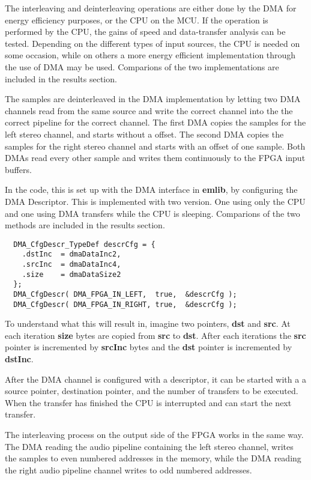The interleaving and deinterleaving operations are either done by the DMA for
energy efficiency purposes, or the CPU on the MCU. If the operation is performed
by the CPU, the gains of speed and data-transfer analysis can be tested. Depending
on the different types of input sources, the CPU is needed on some occasion, while
on others a more energy efficient implementation through the use of DMA may be used.
Comparions of the two implementations are included in the results section.

The samples are deinterleaved in the DMA implementation by letting two DMA channels read from the
same source and write the correct channel into the the correct pipeline for the correct channel.
The first DMA copies the samples for the left stereo channel, and starts without a offset. The
second DMA copies the samples for the right stereo channel and starts with an
offset of one sample. Both DMAs read every other sample and writes them
continuously to the FPGA input buffers.

In the code, this is set up with the DMA interface in {\bf emlib}, by configuring the DMA Descriptor.
This is implemented with two version. One using only the CPU and one using DMA transfers
while the CPU is sleeping. Comparions of the two methods are included in the results section.

\begin{lstlisting}
  DMA_CfgDescr_TypeDef descrCfg = {
    .dstInc  = dmaDataInc2,
    .srcInc  = dmaDataInc4,
    .size    = dmaDataSize2
  };
  DMA_CfgDescr( DMA_FPGA_IN_LEFT,  true,  &descrCfg );
  DMA_CfgDescr( DMA_FPGA_IN_RIGHT, true,  &descrCfg );
\end{lstlisting}
To understand what this will result in, imagine two pointers, {\bf dst} and {\bf src}.
At each iteration {\bf size} bytes are copied from {\bf src} to {\bf dst}. After each
iterations the {\bf src} pointer is incremented by {\bf srcInc} bytes and the {\bf dst}
pointer is incremented by {\bf dstInc}.

After the DMA channel is configured with a descriptor, it can be started with a
a source pointer, destination pointer, and the number of transfers to be executed.
When the transfer has finished the CPU is interrupted and can start the next transfer.

The interleaving process on the output side of the FPGA works in the same way. The DMA reading
the audio pipeline containing the left stereo channel, writes the samples to even numbered
addresses in the memory, while the DMA reading the right audio pipeline channel writes
to odd numbered addresses.


